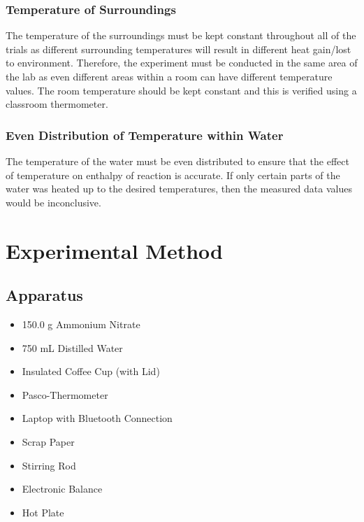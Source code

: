 \documentclass{article}
\begin{document}
\subsubsection{Temperature of Surroundings}
The temperature of the surroundings must be kept constant throughout all of the trials as different surrounding temperatures will result in different heat gain/lost to environment. Therefore, the experiment must be conducted in the same area of the lab as even different areas within a room can have different temperature values. The room temperature should be kept constant and this is verified using a classroom thermometer.

\subsubsection{Even Distribution of Temperature within Water}
The temperature of the water must be even distributed to ensure that the effect of temperature on enthalpy of reaction is accurate. If only certain parts of the water was heated up to the desired temperatures, then the measured data values would be inconclusive.

\section{Experimental Method}
\subsection{Apparatus}
\begin{itemize}
    \item 150.0 g Ammonium Nitrate 
    \item 750 mL Distilled Water
    \item Insulated Coffee Cup (with Lid)
    \item Pasco-Thermometer
    \item Laptop with Bluetooth Connection
    \item Scrap Paper
    \item Stirring Rod
    \item Electronic Balance 
    \item Hot Plate
\end{itemize}
\end{document}

